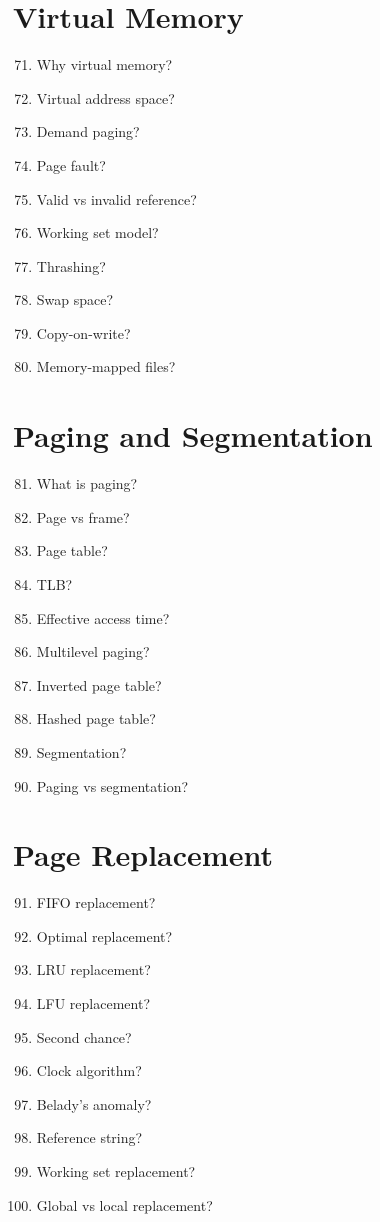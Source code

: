 \section{Virtual Memory}

\begin{enumerate}
\setcounter{enumi}{70}
\item Why virtual memory?
\item Virtual address space?
\item Demand paging?
\item Page fault?
\item Valid vs invalid reference?
\item Working set model?
\item Thrashing?
\item Swap space?
\item Copy-on-write?
\item Memory-mapped files?
\end{enumerate}

\section{Paging and Segmentation}

\begin{enumerate}
\setcounter{enumi}{80}
\item What is paging?
\item Page vs frame?
\item Page table?
\item TLB?
\item Effective access time?
\item Multilevel paging?
\item Inverted page table?
\item Hashed page table?
\item Segmentation?
\item Paging vs segmentation?
\end{enumerate}

\section{Page Replacement}

\begin{enumerate}
\setcounter{enumi}{90}
\item FIFO replacement?
\item Optimal replacement?
\item LRU replacement?
\item LFU replacement?
\item Second chance?
\item Clock algorithm?
\item Belady's anomaly?
\item Reference string?
\item Working set replacement?
\item Global vs local replacement?
\end{enumerate}

